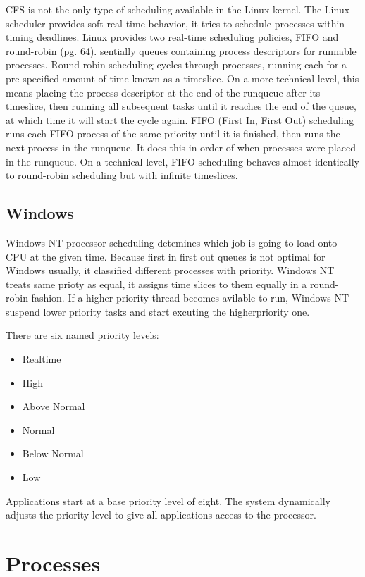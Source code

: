 \documentclass[letterpaper,10pt]{article}
\newcommand{\tab}{\hspace*{2em}} %
\begin{document}
\tab CFS is not the only type of scheduling available in the Linux kernel. The Linux scheduler provides soft real-time behavior, it tries to schedule processes within timing deadlines. Linux provides two real-time scheduling policies, FIFO and round-robin \cite{Love}(pg. 64). sentially queues containing process descriptors for runnable processes. Round-robin scheduling cycles through processes, running each for a pre-specified amount of time known as a timeslice. On a more technical level, this means placing the process descriptor at the end of the runqueue after its timeslice, then running all subsequent tasks until it reaches the end of the queue, at which time it will start the cycle again. FIFO (First In, First Out) scheduling runs each FIFO process of the same priority until it is finished, then runs the next process in the runqueue. It does this in order of when processes were placed in the runqueue. On a technical level, FIFO scheduling behaves almost identically to round-robin scheduling but with infinite timeslices.

\subsection{Windows}
\tab Windows NT processor scheduling detemines which job is going to load onto
CPU at the given time. Because first in first out queues is not optimal for
Windows usually, it classified different processes with priority. Windows NT
treats same prioty as equal, it assigns time slices to them equally in a
round-robin fashion. If a higher priority thread becomes avilable to run,
Windows NT suspend lower priority tasks and start excuting the higherpriority
one\cite{MSDN}.

There are six named priority levels:
\begin{itemize}
    \item Realtime
    \item High
    \item Above Normal
    \item Normal
    \item Below Normal
    \item Low
\end{itemize}
\tab Applications start at a base priority level of eight. The system dynamically
adjusts the priority level to give all applications access to the processor.

\section{Processes}
\end{document}
